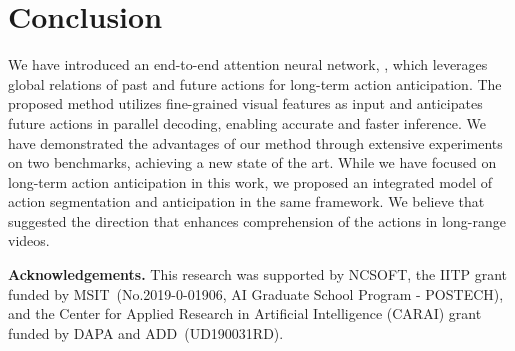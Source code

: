 
\vspace{-2mm}
\section{Conclusion}
We have introduced an end-to-end attention neural network, \ours, which leverages global relations of past and future actions for long-term action anticipation. 
The proposed method utilizes fine-grained visual features as input and anticipates future actions in parallel decoding, enabling accurate and faster inference. 
We have demonstrated the advantages of our method through extensive experiments on two benchmarks, achieving a new state of the art. 
While we have focused on long-term action anticipation in this work, we proposed an integrated model of action segmentation and anticipation in the same framework.
We believe that \ours suggested the direction that enhances comprehension of the actions in long-range videos. 

\vspace{1mm}
\noindent
\textbf{Acknowledgements.} This research was supported by NCSOFT, the IITP grant funded by MSIT~(No.2019-0-01906, AI Graduate School Program - POSTECH), and the Center for Applied Research in Artificial Intelligence (CARAI) grant funded by DAPA and ADD~(UD190031RD). 